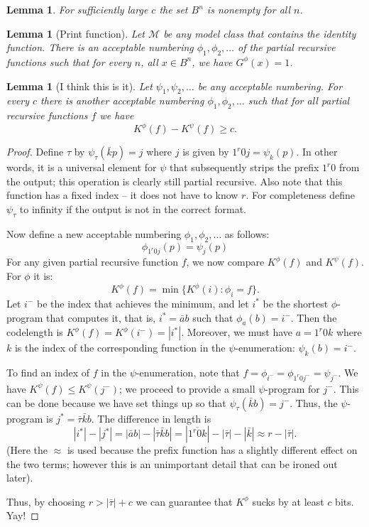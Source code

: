 \documentclass{article}
\newtheorem{lemma}[theorem]{Lemma}
\newcommand{\M}{\mathcal M}
\begin{document}
\begin{lemma}
  For sufficiently large $c$ the set $B^n$ is nonempty for all $n$.
\end{lemma}

\begin{lemma}[Print function]
  Let $\M$ be any model class that contains the identity function. There is an acceptable numbering $\phi_1,\phi_2,\ldots$ of the partial recursive functions such that for every $n$, all $x\in B^n$, 
we have $G^\phi(x)=1$.
\end{lemma}


\begin{lemma}[I think this is it]
Let $\psi_1,\psi_2,\ldots$ be any acceptable numbering.
For every $c$ there is another acceptable numbering $\phi_1,\phi_2,\ldots$ such that for all partial recursive functions $f$ we have
\[
K^\phi(f)-K^\psi(f) \ge c.
\]
\end{lemma}
\begin{proof}
Define $\tau$ by $\psi_\tau(\bar k p) = j$ where $j$ is given by $1^r 0 j = \psi_k(p)$. In other words, it is a universal element for $\psi$ that subsequently strips the prefix $1^r 0 $ from the output; this operation is clearly still partial recursive. Also note that this function has a fixed index -- it does not have to know $r$. For completeness define $\psi_\tau$ to infinity if the output is not in the correct format.

Now define a new acceptable numbering $\phi_1,\phi_2,\ldots$ as follows:
\[
\phi_{1^r0 j}(p)=\psi_j(p)
\]
For any given partial recursive function $f$, we now compare $K^\phi(f)$ and $K^\psi(f)$.
For $\phi$ it is:
\[
K^\phi(f) = \min\{K^\phi(i):\phi_i = f\}.
\]
Let $i^-$ be the index that achieves the minimum, and let $i^*$ be the shortest $\phi$-program that computes it, that is, $i^*=\bar a b$ such that $\phi_a(b)=i^-$.
Then the codelength is $K^\phi(f)=K^\phi(i^-)=|i^*|$. Moreover, we must have $a=1^r0 k$ where $k$ is the index of the corresponding function in the $\psi$-enumeration: $\psi_k(b)=i^-$.

To find an index of $f$ in the $\psi$-enumeration, note that $f=\phi_{i^-}=\phi_{1^r 0 j^-} = \psi_{j^-}$. We have $K^\psi(f) \le K^\psi(j^-)$; we proceed to provide a small $\psi$-program for $j^-$. This can be done because we have set things up so that $\psi_\tau(\bar k b)=j^-$. Thus, the $\psi$-program is $j^*=\bar\tau\bar k b$. The difference in length is
%
\[
|i^*|-|j^*| = |\bar a b|-|\bar\tau\bar k b| = |\overline{1^r 0 k}| - |\bar\tau| - |\bar k| \approx r-|\bar\tau|.
\]
%
(Here the $\approx$ is used because the prefix function has a slightly different effect on the two terms; however this is an unimportant detail that can be ironed out later).

Thus, by choosing $r>|\bar\tau|+c$ we can guarantee that $K^\phi$ sucks by at least $c$ bits. Yay!
\end{proof}





\end{document}
